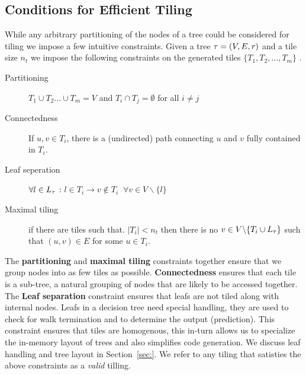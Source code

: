\subsection*{Conditions for Efficient Tiling}
\label{sec:ValidTiling}
While any arbitrary partitioning of the nodes of a tree could be considered for tiling we impose a few intuitive constraints.
Given a tree $\operatorname{\tau} = (V, E, r)$ and a tile size $n_t$ we impose the following constraints on the generated tiles $\{ T_1, T_2, ... ,T_m \}$ .
\begin{description}
    \item[Partitioning] $T_1 \cup T_2 ... \cup T_m = V$ and $T_i \cap T_j = \emptyset$ for all $i\neq j$
    \item[Connectedness] If $u, v \in T_i$, there is a (undirected) path connecting $u$ and $v$ fully contained in $T_i$.
   \item [Leaf seperation] $\forall l \in L_{\operatorname{\tau}}$ : $l \in T_i \rightarrow v \notin T_i \;\; \forall v \in V \backslash \{l\}$
  \item [Maximal tiling] if there are tiles such that. $|T_i| < n_t$ then there is no $v \in V\backslash \{ T_i \cup L_{\operatorname{\tau}} \}$ such that $(u, v) \in E$ for some $u \in T_i$. 
\end{description}
The \textbf{partitioning} and \textbf{maximal tiling} constraints together ensure that we group nodes into as few tiles as possible. {\textbf{Connectedness}} ensures that each tile is a sub-tree, a natural grouping of nodes that are likely to be accessed together. The {\textbf{Leaf separation}} constraint ensures that leafs are not tiled along with internal nodes. Leafs in a decision tree need special handling, they are used to check for walk termination and to determine the output (prediction). This constraint ensures that tiles are homogenous, this in-turn allows us to specialize the in-memory layout of trees and also simplifies code generation. We discuss leaf handling and tree layout in Section~\ref{sec:}.
We refer to any tiling that satisties the above constraints as a \emph{valid} tilling.

